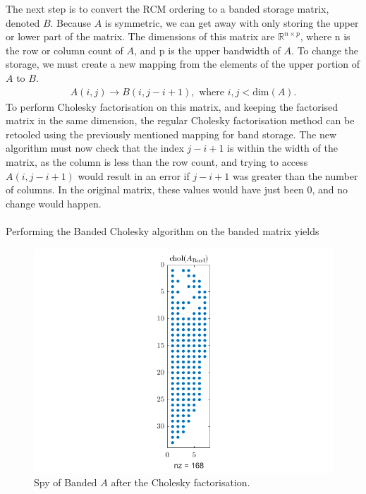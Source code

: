 \documentclass[12pt,a4paper]{article}
\begin{document}
The next step is to convert the RCM ordering to a banded storage matrix, denoted $B$. Because $A$ is symmetric, we can get away with only storing the upper or lower part of the matrix. The dimensions of this matrix are $\mathbb{R}^{n\times p}$, where n is the row or column count of $A$, and p is the upper bandwidth of $A$. To change the storage, we must create a new mapping from the elements of the upper portion of $A$ to $B$.
\begin{align*}
A(i,j)\to B(i,j-i+1), \text{ where } i,j < \text{dim}(A).
\end{align*}
To perform Cholesky factorisation on this matrix, and keeping the factorised matrix in the same dimension, the regular Cholesky factorisation method can be retooled using the previously mentioned mapping for band storage.
The new algorithm must now check that the index $j-i+1$ is within the width of the matrix, as the column is less than the row count, and trying to access $A(i,j-i+1)$ would result in an error if $j-i+1$ was greater than the number of columns. In the original matrix, these values would have just been 0, and no change would happen.\\\\Performing the Banded Cholesky algorithm on the banded matrix yields
\begin{figure}[H]
	\begin{center}
		\includegraphics[width=\linewidth]{images/cholband.png}
		\caption{Spy of Banded $A$ after the Cholesky factorisation.}
		\label{fig:cholband}
	\end{center}
\end{figure}
\end{document}
